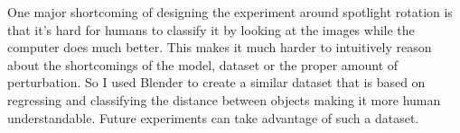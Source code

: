 \documentclass[../thesis.tex]{subfiles}
\begin{document}
One major shortcoming of designing the experiment around spotlight rotation is that it's hard for humans to classify it by looking at the images while the computer does much better. This makes it much harder to intuitively reason about the shortcomings of the model, dataset or the proper amount of perturbation. So I used Blender to create a similar dataset that is based on regressing and classifying the distance between objects making it more human understandable. Future experiments can take advantage of such a dataset.  

\end{document}
